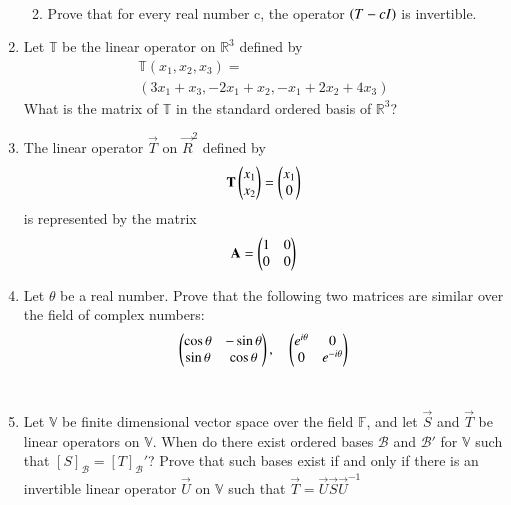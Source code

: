 \begin{enumerate}[label=\thesubsection.\arabic*.,ref=\thesubsection.\theenumi]
\begin{enumerate}
%
\\
\solution

\item Prove that for every real number c, the operator $\left(T-cI\right)$ is invertible.
%
\\
\solution

\end{enumerate}
\item Let $\mathbb{T}$ be the linear operator on $\mathbb{R}^3$ defined by 
\begin{align}
    \mathbb{T}(x_1,x_2,x_3)=\\(3x_1+x_3,-2x_1+x_2,-x_1+2x_2+4x_3)\label{eq:solutions/3/4/7/a/1}
\end{align}
What is the matrix of $\mathbb{T}$ in the standard ordered basis of $\mathbb{R}^3$?
%
\\
\solution

\item The linear operator $\vec{T}$ on $\vec{R}^2$ defined by 
\begin{align}
	\mathbf{T}\begin{pmatrix}x_1\\x_2\end{pmatrix}=\begin{pmatrix}x_1\\0\end{pmatrix}
\end{align}
is represented by the matrix
\begin{align}
	\mathbf{A}=\begin{pmatrix}1&0\\
		       0&0\end{pmatrix}
\end{align}
\item Let $\theta$ be a real number. Prove that the following two matrices are similar over the field of complex numbers: 
\begin{align}
    \begin{pmatrix}\cos{\theta} & -\sin{\theta} \\ \sin{\theta} & \cos{\theta}\end{pmatrix},
    \quad
    \begin{pmatrix}e^{i\theta} & 0 \\ 0 & e^{-i\theta}\end{pmatrix} \nonumber
\end{align}
%
\\
\solution

\item Let $\mathbb V$ be finite dimensional vector space over the field $\mathbb F$, and let $\vec{S}$ and $\vec{T}$ be linear operators on $\mathbb V$. When do there exist ordered bases $\mathcal{B}$ and $\mathcal{B}'$ for $\mathbb V$ such that $[S]_\mathcal{B} = [T]_\mathcal{B}'$? Prove that such bases exist if and only if there is an invertible linear operator $\vec{U}$ on $\mathbb V$ such that $\vec{T} = \vec{U}\vec{S}\vec{U}^{-1}$
%
\\
\solution


\end{enumerate}
